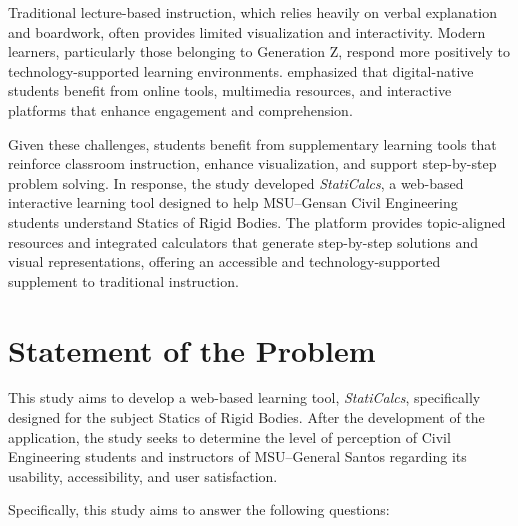 Traditional lecture-based instruction, which relies heavily on verbal explanation and boardwork, often provides limited visualization and interactivity. Modern learners, particularly those belonging to Generation Z, respond more positively to technology-supported learning environments. \cite{szymkowiak_information_2021} emphasized that digital-native students benefit from online tools, multimedia resources, and interactive platforms that enhance engagement and comprehension.

Given these challenges, students benefit from supplementary learning tools that reinforce classroom instruction, enhance visualization, and support step-by-step problem solving. In response, the study developed \textit{StatiCalcs}, a web-based interactive learning tool designed to help MSU–Gensan Civil Engineering students understand Statics of Rigid Bodies. The platform provides topic-aligned resources and integrated calculators that generate step-by-step solutions and visual representations, offering an accessible and technology-supported supplement to traditional instruction.


\section{Statement of the Problem}\label{sec:1-sop}

This study aims to develop a web-based learning tool, \textit{StatiCalcs}, specifically designed for the subject Statics of Rigid Bodies. After the development of the application, the study seeks to determine the level of perception of Civil Engineering students and instructors of MSU--General Santos regarding its usability, accessibility, and user satisfaction. 

\bigskip
Specifically, this study aims to answer the following questions:

